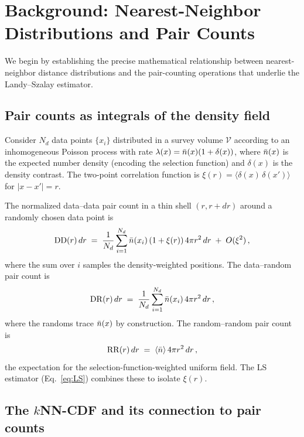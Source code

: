 \section{Background: Nearest-Neighbor Distributions and Pair Counts}
\label{sec:background}

We begin by establishing the precise mathematical relationship between nearest-neighbor distance distributions and the pair-counting operations that underlie the Landy--Szalay estimator.

\subsection{Pair counts as integrals of the density field}
\label{sec:pair_counts}

Consider $N_d$ data points $\{x_i\}$ distributed in a survey volume $\mathcal{V}$ according to an inhomogeneous Poisson process with rate $\lambda(x) = \bar{n}(x)(1 + \delta(x))$, where $\bar{n}(x)$ is the expected number density (encoding the selection function) and $\delta(x)$ is the density contrast.  The two-point correlation function is $\xi(r) = \langle \delta(x)\,\delta(x') \rangle$ for $|x - x'| = r$.

The normalized data--data pair count in a thin shell $(r, r + dr)$ around a randomly chosen data point is
\begin{equation}
  \mathrm{DD}(r)\,dr \;=\; \frac{1}{N_d}\sum_{i=1}^{N_d} \bar{n}(x_i)\,(1 + \xi(r))\,4\pi r^2\,dr \;+\; O(\xi^2)\,,
  \label{eq:DD_shell}
\end{equation}
where the sum over $i$ samples the density-weighted positions.  The data--random pair count is
\begin{equation}
  \mathrm{DR}(r)\,dr \;=\; \frac{1}{N_d}\sum_{i=1}^{N_d} \bar{n}(x_i)\,4\pi r^2\,dr\,,
  \label{eq:DR_shell}
\end{equation}
where the randoms trace $\bar{n}(x)$ by construction.  The random--random pair count is
\begin{equation}
  \mathrm{RR}(r)\,dr \;=\; \langle \bar{n} \rangle\,4\pi r^2\,dr\,,
  \label{eq:RR_shell}
\end{equation}
the expectation for the selection-function-weighted uniform field.  The LS estimator (Eq.~\ref{eq:LS}) combines these to isolate $\xi(r)$.

\subsection{The $k$NN-CDF and its connection to pair counts}
\label{sec:knn_pair}

